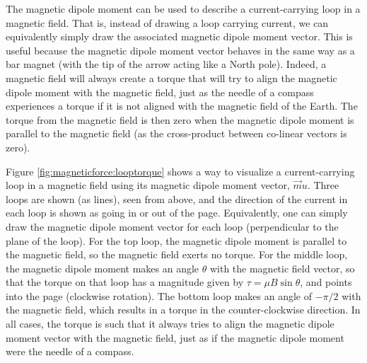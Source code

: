 The magnetic dipole moment can be used to describe a current-carrying loop in a magnetic field. That is, instead of drawing a loop carrying current, we can equivalently simply draw the associated magnetic dipole moment vector. This is useful because the magnetic dipole moment vector behaves in the same way as a bar magnet (with the tip of the arrow acting like a North pole). Indeed, a magnetic field will always create a torque that will try to align the magnetic dipole moment with the magnetic field, just as the needle of a compass experiences a torque if it is not aligned with the magnetic field of the Earth. The torque from the magnetic field is then zero when the magnetic dipole moment is parallel to the magnetic field (as the cross-product between co-linear vectors is zero). 

Figure \ref{fig:magneticforce:looptorque} shows a way to visualize a current-carrying loop in a magnetic field using its magnetic dipole moment vector, $\vec mu$.  
Three loops are shown (as lines), seen from above, and the direction of the current in each loop is shown as going in or out of the page. Equivalently, one can simply draw the magnetic dipole moment vector for each loop (perpendicular to the plane of the loop). For the top loop, the magnetic dipole moment is parallel to the magnetic field, so the magnetic field exerts no torque. For the middle loop, the magnetic dipole moment makes an angle $\theta$ with the magnetic field vector, so that the torque on that loop has a magnitude given by $\tau=\mu B \sin\theta$, and points into the page (clockwise rotation). The bottom loop makes an angle of $-\pi/2$ with the magnetic field, which results in a torque in the counter-clockwise direction. In all cases, the torque is such that it always tries to align the magnetic dipole moment vector with the magnetic field, just as if the magnetic dipole moment were the needle of a compass. 

